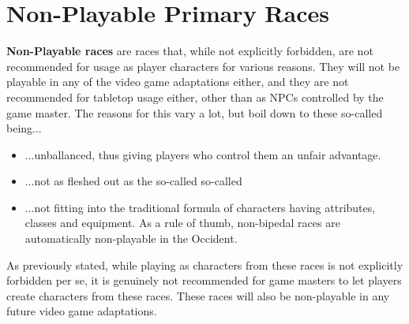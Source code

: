 \section{Non-Playable Primary Races}
\textbf{Non-Playable races} are races that, while not explicitly forbidden, are not recommended for usage as player characters for various reasons. They will not be playable in any of the video game adaptations either, and they are not recommended for tabletop usage either, other than as NPCs controlled by the game master. The reasons for this vary a lot, but boil down to these so-called  being...
\begin{itemize}
	\item ...unballanced, thus giving players who control them an unfair advantage.
	\item ...not as fleshed out as the so-called so-called 
	\item ...not fitting into the traditional formula of characters having attributes, classes and equipment. As a rule of thumb, non-bipedal races are automatically non-playable in the Occident.
\end{itemize}
As previously stated, while playing as characters from these races is not explicitly forbidden per se, it is genuinely not recommended for game masters to let players create characters from these races. These races will also be non-playable in any future video game adaptations.
